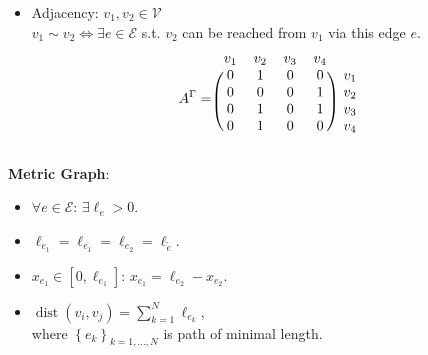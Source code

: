 \documentclass[9pt]{beamer}
\begin{document}
\begin{frame}
    \begin{itemize}
        \item Adjacency: $v_1, v_2 \in \mathcal{V}$ \\ $v_1 \sim v_2 \Leftrightarrow \exists e \in \mathcal{E}$ s.t. $v_2$ can be reached from $v_1$ via this edge $e$. \\
        \begin{equation*}
          A^{\Gamma} = 
          \begin{blockarray}{ccccc}
              v_1 & v_2 & v_3 & v_4 \\
              \begin{block}{(cccc)c}
                  0 & 1 & 0 & 0 & v_1 \\
                  0 & 0 & 0 & 1 & v_2 \\
                  0 & 1 & 0 & 1 & v_3 \\
                  0 & 1 & 0 & 0 & v_4 \\
              \end{block}
          \end{blockarray}
      \end{equation*}
    \end{itemize}
    \textbf{Metric Graph}:
        \begin{itemize}
            \item $\forall e \in \mathcal{E} \colon \, \exists \ell_e > 0$.
            \item $\ell_{e_1} = \ell_{\overline{e_1}} = \ell_{e_2} = \ell_{\tilde{e}}$.
            \item $x_{e_1} \in [0, \ell_{e_1}] \colon \, x_{e_1} = \ell_{e_2} - x_{e_2}$.
            \item $\operatorname{dist}(v_i, v_j) = \sum^{N}_{k = 1} \ell_{e_k}$, \\ where $\left\{ e_k \right\}_{k = 1, \ldots, N}$ is path of minimal length.
        \end{itemize}
\end{frame}
\end{document}
